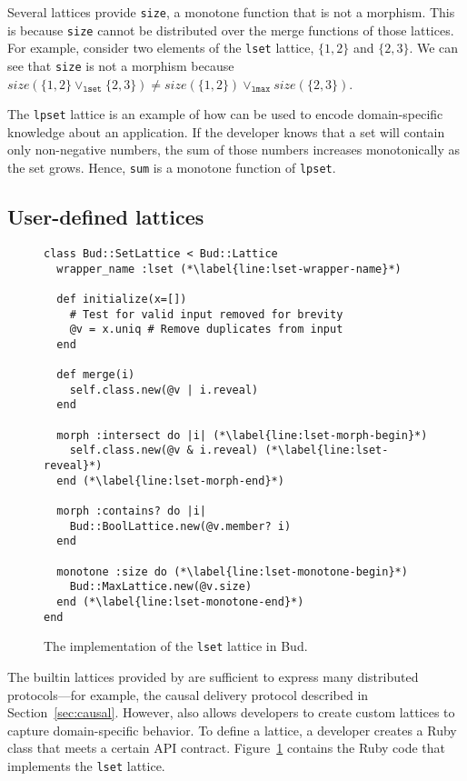 Several lattices provide \texttt{size}, a monotone function that is not a
morphism. This is because \texttt{size} cannot be distributed over the merge
functions of those lattices. For example, consider two elements of the
\texttt{lset} lattice, $\{1,2\}$ and $\{2,3\}$.  We can see that \texttt{size} is not a morphism because $size(\{1,2\} \lor_{\mathtt{lset}}
\{2,3\}) \ne size(\{1,2\}) \lor_{\mathtt{lmax}} size(\{2,3\})$.

The \texttt{lpset} lattice is an example of how \lang can be used to encode
domain-specific knowledge about an application. If the developer knows that a
set will contain only non-negative numbers, the sum of those numbers increases
monotonically as the set grows. Hence, \texttt{sum} is a monotone function of
\texttt{lpset}.%

\subsection{User-defined lattices}
\begin{figure}[t]
\begin{scriptsize}
\begin{lstlisting}[deletekeywords={lset}]
class Bud::SetLattice < Bud::Lattice
  wrapper_name :lset (*\label{line:lset-wrapper-name}*)

  def initialize(x=[])
    # Test for valid input removed for brevity
    @v = x.uniq # Remove duplicates from input
  end

  def merge(i)
    self.class.new(@v | i.reveal)
  end

  morph :intersect do |i| (*\label{line:lset-morph-begin}*)
    self.class.new(@v & i.reveal) (*\label{line:lset-reveal}*)
  end (*\label{line:lset-morph-end}*)

  morph :contains? do |i|
    Bud::BoolLattice.new(@v.member? i)
  end

  monotone :size do (*\label{line:lset-monotone-begin}*)
    Bud::MaxLattice.new(@v.size)
  end (*\label{line:lset-monotone-end}*)
end
\end{lstlisting}
\end{scriptsize}
\caption{The implementation of the \texttt{lset} lattice in Bud.}
\label{fig:lattice-lset}
\end{figure}

\label{sec:lattice-api}
The builtin lattices provided by \lang are sufficient to express many
distributed protocols---for example, the causal delivery protocol described in
Section~\ref{sec:causal}. However, \lang also allows developers to create
custom lattices to capture domain-specific behavior. To define a lattice, a
developer creates a Ruby class that meets a certain API
contract. Figure~\ref{fig:lattice-lset} contains the Ruby code that implements
the \texttt{lset} lattice.

